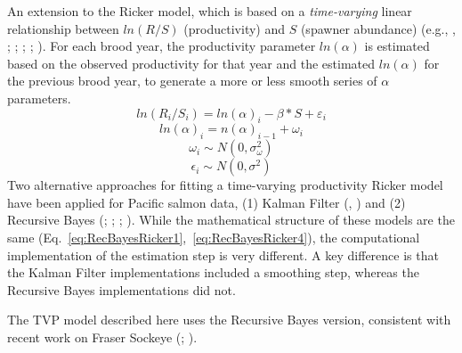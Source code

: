 \documentclass[french,11pt]{book}
\begin{document}
An extension to the Ricker model, which is based on a \emph{time-varying} linear relationship between \(ln(R/S)\) (productivity) and \(S\) (spawner abundance) (e.g., , ; ; ; ; ). For each brood year, the productivity parameter \(ln(\alpha)\) is estimated based on the observed productivity for that year and the estimated \(ln(\alpha)\) for the previous brood year, to generate a more or less smooth series of \(\alpha\) parameters.
\begin{equation} 
  ln(R_{i}/S_{i}) = ln(\alpha)_i - \beta * S + \varepsilon_{i}
  \label{eq:RecBayesRicker1}
\end{equation}
\begin{equation} 
  ln(\alpha)_{i} = n(\alpha)_{i-1} + \omega_{i}
  \label{eq:RecBayesRicker2}
\end{equation}
\begin{equation} 
  \omega_i \sim N(0,\sigma_{\omega}^2)
  \label{eq:RecBayesRicker3}
\end{equation}
\begin{equation} 
  \epsilon_i \sim N(0,\sigma^2)
  \label{eq:RecBayesRicker4}
\end{equation}
Two alternative approaches for fitting a time-varying productivity Ricker model have been applied for Pacific salmon data, (1) Kalman Filter (, ) and (2) Recursive Bayes (; ; ; ). While the mathematical structure of these models are the same (Eq.~\ref{eq:RecBayesRicker1},~\ref{eq:RecBayesRicker4}), the computational implementation of the estimation step is very different. A key difference is that the Kalman Filter implementations included a smoothing step, whereas the Recursive Bayes implementations did not.

The TVP model described here uses the Recursive Bayes version, consistent with recent work on Fraser Sockeye (; ).
\end{document}
